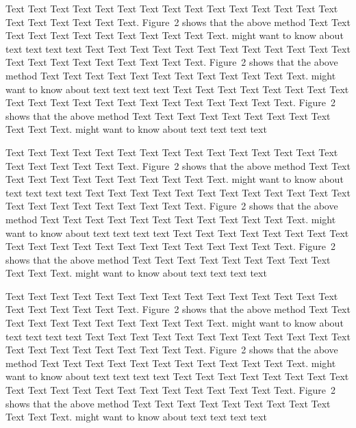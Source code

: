 \documentclass{bioinfo}
\begin{document}
\begin{methods}
        Text Text Text Text Text Text Text Text Text Text Text Text Text
        Text Text Text Text Text Text Text Text.
        Figure~2\vphantom{\ref{fig:02}} shows that the above method Text
        Text Text Text Text Text Text Text Text Text Text Text.
        \citealp{Boffelli03} might want to know about text text text text
        Text Text Text Text Text Text Text Text Text Text Text Text Text
        Text Text Text Text Text Text Text Text.
        Figure~2\vphantom{\ref{fig:02}} shows that the above method Text
        Text Text Text Text Text Text Text Text Text Text Text.
        \citealp{Boffelli03} might want to know about text text text text
        Text Text Text Text Text Text Text Text Text Text Text Text Text
        Text Text Text Text Text Text Text Text.
        Figure~2\vphantom{\ref{fig:02}} shows that the above method Text
        Text Text Text Text Text Text Text Text Text Text Text.
        \citealp{Boffelli03} might want to know about text text text text


        Text Text Text Text Text Text Text Text Text Text Text Text Text
        Text Text Text Text Text Text Text Text.
        Figure~2\vphantom{\ref{fig:02}} shows that the above method Text
        Text Text Text Text Text Text Text Text Text Text Text.
        \citealp{Boffelli03} might want to know about text text text text
        Text Text Text Text Text Text Text Text Text Text Text Text Text
        Text Text Text Text Text Text Text Text.
        Figure~2\vphantom{\ref{fig:02}} shows that the above method Text
        Text Text Text Text Text Text Text Text Text Text Text.
        \citealp{Boffelli03} might want to know about text text text text
        Text Text Text Text Text Text Text Text Text Text Text Text Text
        Text Text Text Text Text Text Text Text.
        Figure~2\vphantom{\ref{fig:02}} shows that the above method Text
        Text Text Text Text Text Text Text Text Text Text Text.
        \citealp{Boffelli03} might want to know about text text text text


        Text Text Text Text Text Text Text Text Text Text Text Text Text
        Text Text Text Text Text Text Text Text.
        Figure~2\vphantom{\ref{fig:02}} shows that the above method Text
        Text Text Text Text Text Text Text Text Text Text Text.
        \citealp{Boffelli03} might want to know about text text text text
        Text Text Text Text Text Text Text Text Text Text Text Text Text
        Text Text Text Text Text Text Text Text.
        Figure~2\vphantom{\ref{fig:02}} shows that the above method Text
        Text Text Text Text Text Text Text Text Text Text Text.
        \citealp{Boffelli03} might want to know about text text text text
        Text Text Text Text Text Text Text Text Text Text Text Text Text
        Text Text Text Text Text Text Text Text.
        Figure~2\vphantom{\ref{fig:02}} shows that the above method Text
        Text Text Text Text Text Text Text Text Text Text Text.
        \citealp{Boffelli03} might want to know about text text text text


\end{methods}
\end{document}
